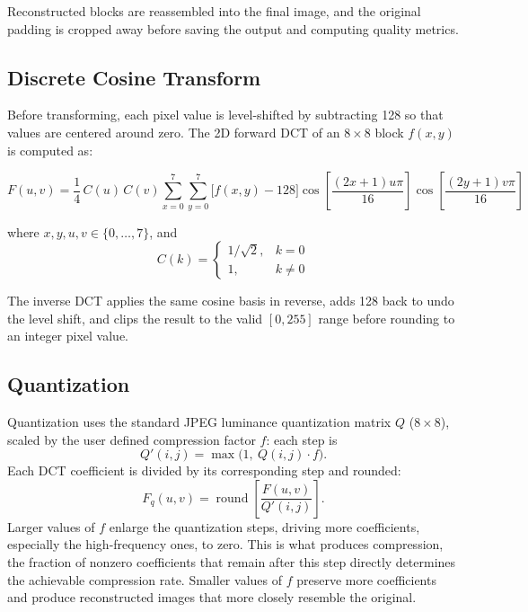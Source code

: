\documentclass[11pt,a4paper]{article}
\begin{document}
Reconstructed blocks are reassembled into the final image, and the original padding is cropped away before saving the output and computing quality metrics.

\subsection{Discrete Cosine Transform}

Before transforming, each pixel value is level-shifted by subtracting 128 so that values are centered around zero. The 2D forward DCT of an $8\times8$ block $f(x,y)$ is computed as:

\begin{equation}
F(u,v) = \frac{1}{4}\, C(u)\, C(v) \sum_{x=0}^{7}\sum_{y=0}^{7} \big[f(x,y) - 128\big] \cos\!\left[\frac{(2x+1)u\pi}{16}\right]\cos\!\left[\frac{(2y+1)v\pi}{16}\right]
\end{equation}

where $x,y,u,v \in \{0,\dots,7\}$, and
\begin{equation}
C(k) =
\begin{cases}
1/\sqrt{2}, & k = 0 \\
1, & k \neq 0
\end{cases}
\end{equation}

The inverse DCT applies the same cosine basis in reverse, adds 128 back to undo the level shift, and clips the result to the valid $[0,255]$ range before rounding to an integer pixel value.

\subsection{Quantization}

Quantization uses the standard JPEG luminance quantization matrix $Q$ ($8\times8$), scaled by the user defined compression factor $f$: each step is
\begin{equation}
Q'(i,j) = \max\big(1,\ Q(i,j)\cdot f\big).
\end{equation}
Each DCT coefficient is divided by its corresponding step and rounded:
\begin{equation}
F_q(u,v) = \operatorname{round}\!\left[\frac{F(u,v)}{Q'(i,j)}\right].
\end{equation}
Larger values of $f$ enlarge the quantization steps, driving more coefficients, especially the high-frequency ones, to zero. This is what produces compression, the fraction of nonzero coefficients that remain after this step directly determines the achievable compression rate. Smaller values of $f$ preserve more coefficients and produce reconstructed images that more closely resemble the original.
\end{document}
